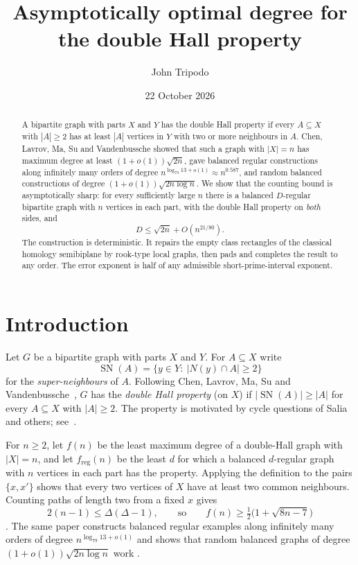 \documentclass[11pt]{amsart}
\title{Asymptotically optimal degree for the double Hall property}
\author{John Tripodo}
\date{22 October 2026}
\theoremstyle{definition}
\theoremstyle{remark}
\newcommand{\sn}{\operatorname{SN}}
\newcommand{\freg}{f_{\mathrm{reg}}}
\begin{document}
\begin{abstract}
A bipartite graph with parts $X$ and $Y$ has the double Hall property if every
$A\subseteq X$ with $|A|\ge 2$ has at least $|A|$ vertices in $Y$ with two or more
neighbours in $A$. Chen, Lavrov, Ma, Su and Vandenbussche showed that such a graph with
$|X|=n$ has maximum degree at least $(1+o(1))\sqrt{2n}$, gave balanced regular
constructions along infinitely many orders of degree $n^{\log_{79}13+o(1)}\approx n^{0.587}$, and random balanced
constructions of degree $(1+o(1))\sqrt{2n\log n}$. We show that the counting bound is
asymptotically sharp: for every sufficiently large $n$ there is a balanced $D$-regular
bipartite graph with $n$ vertices in each part, with the double Hall property on
\emph{both} sides, and
\[
  D \le \sqrt{2n} + O\!\left(n^{21/80}\right).
\]
The construction is deterministic. It repairs the empty class rectangles of the classical
homology semibiplane by rook-type local graphs, then pads and completes the result to any
order. The error exponent is half of any admissible short-prime-interval exponent.
\end{abstract}

\maketitle

\section{Introduction}

Let $G$ be a bipartite graph with parts $X$ and $Y$. For $A\subseteq X$ write
\[
  \sn(A)=\{y\in Y:\ |N(y)\cap A|\ge 2\}
\]
for the \emph{super-neighbours} of $A$. Following Chen, Lavrov, Ma, Su and
Vandenbussche~\cite{CLMSV}, $G$ has the \emph{double Hall property} (on $X$) if
$|\sn(A)|\ge|A|$ for every $A\subseteq X$ with $|A|\ge 2$. The property is motivated by
cycle questions of Salia and others; see~\cite{CLMSV,BGJNP}.

For $n\ge2$, let $f(n)$ be the least maximum degree of a double-Hall graph with $|X|=n$, and let
$\freg(n)$ be the least $d$ for which a balanced $d$-regular graph with $n$ vertices in
each part has the property. Applying the definition to the pairs $\{x,x'\}$ shows that every
two vertices of $X$ have at least two common neighbours. Counting paths of length two from a
fixed $x$ gives
\begin{equation}\label{eq:lower}
  2(n-1)\le \Delta(\Delta-1),\qquad\text{so}\qquad f(n)\ge \tfrac12\bigl(1+\sqrt{8n-7}\bigr)
\end{equation}
\cite[Theorem~1.10]{CLMSV}. The same paper constructs balanced regular examples along infinitely many orders of degree
$n^{\log_{79}13+o(1)}$ \cite[Theorem~1.11]{CLMSV} and shows that random balanced graphs
of degree $(1+o(1))\sqrt{2n\log n}$ work \cite[Theorem~1.12]{CLMSV}.
\end{document}
